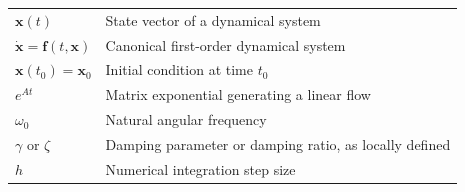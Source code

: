 \begin{longtable}{@{}p{}p{}@{}}
$\mathbf x(t)$ & State vector of a dynamical system\\
$\dot{\mathbf x}=\mathbf f(t,\mathbf x)$ & Canonical first-order dynamical system\\
$\mathbf x(t_0)=\mathbf x_0$ & Initial condition at time $t_0$\\
$e^{At}$ & Matrix exponential generating a linear flow\\
$\omega_0$ & Natural angular frequency\\
$\gamma$ or $\zeta$ & Damping parameter or damping ratio, as locally defined\\
$h$ & Numerical integration step size\\
\bottomrule
\end{longtable}
